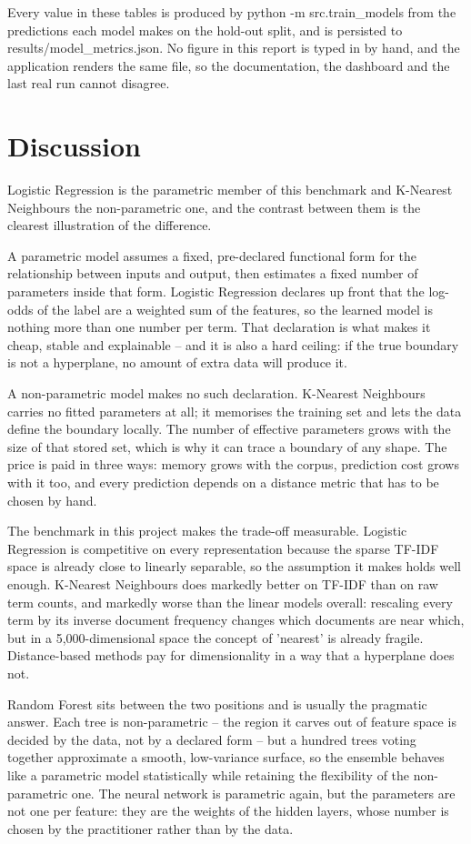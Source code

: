 \documentclass[conference,a4paper]{IEEEtran}
\begin{document}
Every value in these tables is produced by python -m src.train\_models from the predictions each model makes on the hold-out split, and is persisted to results/model\_metrics.json. No figure in this report is typed in by hand, and the application renders the same file, so the documentation, the dashboard and the last real run cannot disagree.

\section{Discussion}

Logistic Regression is the parametric member of this benchmark and K-Nearest Neighbours the non-parametric one, and the contrast between them is the clearest illustration of the difference.

A parametric model assumes a fixed, pre-declared functional form for the relationship between inputs and output, then estimates a fixed number of parameters inside that form. Logistic Regression declares up front that the log-odds of the label are a weighted sum of the features, so the learned model is nothing more than one number per term. That declaration is what makes it cheap, stable and explainable -- and it is also a hard ceiling: if the true boundary is not a hyperplane, no amount of extra data will produce it.

A non-parametric model makes no such declaration. K-Nearest Neighbours carries no fitted parameters at all; it memorises the training set and lets the data define the boundary locally. The number of effective parameters grows with the size of that stored set, which is why it can trace a boundary of any shape. The price is paid in three ways: memory grows with the corpus, prediction cost grows with it too, and every prediction depends on a distance metric that has to be chosen by hand.

The benchmark in this project makes the trade-off measurable. Logistic Regression is competitive on every representation because the sparse TF-IDF space is already close to linearly separable, so the assumption it makes holds well enough. K-Nearest Neighbours does markedly better on TF-IDF than on raw term counts, and markedly worse than the linear models overall: rescaling every term by its inverse document frequency changes which documents are near which, but in a 5,000-dimensional space the concept of 'nearest' is already fragile. Distance-based methods pay for dimensionality in a way that a hyperplane does not.

Random Forest sits between the two positions and is usually the pragmatic answer. Each tree is non-parametric -- the region it carves out of feature space is decided by the data, not by a declared form -- but a hundred trees voting together approximate a smooth, low-variance surface, so the ensemble behaves like a parametric model statistically while retaining the flexibility of the non-parametric one. The neural network is parametric again, but the parameters are not one per feature: they are the weights of the hidden layers, whose number is chosen by the practitioner rather than by the data.
\end{document}

